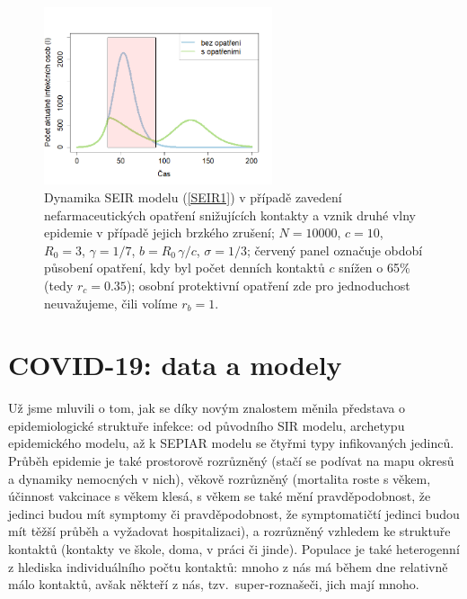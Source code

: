 \begin{figure}[h]
	\begin{center}
			\includegraphics[width=0.6\textwidth]{pic/two_waves.png}
	\end{center}
	\caption{Dynamika SEIR modelu (\ref{SEIR1}) v případě zavedení nefarmaceutických opatření snižujících kontakty a vznik druhé vlny epidemie v případě jejich brzkého zrušení; $N=10000$, $c=10$, $R_0=3$, $\gamma=1/7$, $b=R_0\,\gamma/c$, $\sigma=1/3$; červený panel označuje období působení opatření, kdy byl počet denních kontaktů $c$ snížen o 65\% (tedy $r_c=0.35$); osobní protektivní opatření zde pro jednoduchost neuvažujeme, čili volíme $r_b=1$. %
	}
	\label{SEIR-vlna}
\end{figure}

\section*{COVID-19: data a modely}

Už jsme mluvili o tom, jak se díky novým znalostem měnila představa o epidemiologické struktuře infekce: od původního SIR modelu, archetypu epidemického modelu, až k SEPIAR modelu se čtyřmi typy infikovaných jedinců. Průběh epidemie je také prostorově rozrůzněný (stačí se podívat na mapu okresů a dynamiky nemocných v nich), věkově rozrůzněný (mortalita roste s věkem, účinnost vakcinace s věkem klesá, s věkem se také mění pravděpodobnost, že jedinci budou mít symptomy či pravděpodobnost, že symptomatičtí jedinci budou mít těžší průběh a vyžadovat hospitalizaci), a rozrůzněný vzhledem ke struktuře kontaktů (kontakty ve škole, doma, v práci či jinde). Populace je také heterogenní z hlediska individuálního počtu kontaktů: mnoho z nás má během dne relativně málo kontaktů, avšak někteří z nás, tzv.\ super-roznašeči, jich mají mnoho. 

